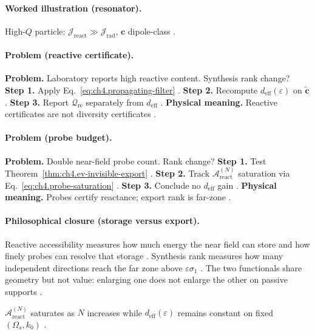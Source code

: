 \paragraph{Worked illustration (resonator).}
High-\(Q\) particle: \(\mathcal{J}_{\mathrm{react}}\gg\mathcal{J}_{\mathrm{rad}}\), \(\mathbf{c}\) dipole-class \cite{jackson1999,stratton1941,harrington2001}.

\paragraph{Problem (reactive certificate).}
\textbf{Problem.} Laboratory reports high reactive content. Synthesis rank change?
\textbf{Step 1.} Apply Eq.~\eqref{eq:ch4.propagating-filter} \cite{stratton1941,harrington2001}.
\textbf{Step 2.} Recompute \(d_{\mathrm{eff}}(\varepsilon)\) on \(\widetilde{\mathbf{c}}\) \cite{hansen1988,devaney2004}.
\textbf{Step 3.} Report \(\mathcal{Q}_{\mathrm{re}}\) separately from \(d_{\mathrm{eff}}\) \cite{harrington2001}.
\textbf{Physical meaning.} Reactive certificates are not diversity certificates \cite{stratton1941}.

\paragraph{Problem (probe budget).}
\textbf{Problem.} Double near-field probe count. Rank change?
\textbf{Step 1.} Test Theorem~\ref{thm:ch4.ev-invisible-export} \cite{stratton1941,harrington2001}.
\textbf{Step 2.} Track \(\mathcal{A}_{\mathrm{react}}^{(N)}\) saturation via Eq.~\eqref{eq:ch4.probe-saturation} \cite{devaney2004}.
\textbf{Step 3.} Conclude no \(d_{\mathrm{eff}}\) gain \cite{hansen1988}.
\textbf{Physical meaning.} Probes certify reactance; export rank is far-zone \cite{stratton1941}.

\paragraph{Philosophical closure (storage versus export).}
Reactive accessibility measures how much energy the near field can store and how finely probes can resolve that storage
\cite{stratton1941,harrington2001,jackson1999}. Synthesis rank measures how many independent directions reach the far zone above \(\varepsilon\sigma_{1}\)
\cite{hansen1988,devaney2004}. The two functionals share geometry but not value: enlarging one does not enlarge the other on passive supports
\cite{stratton1941,harrington2001}.

\begin{corollary}
\label{cor:ch4.reactive-saturation}
\(\mathcal{A}_{\mathrm{react}}^{(N)}\) saturates as \(N\) increases while \(d_{\mathrm{eff}}(\varepsilon)\) remains constant on fixed \((\Omega_{s},k_{0})\)
\cite{harrington2001,devaney2004,hansen1988,stratton1941}.
\end{corollary}
